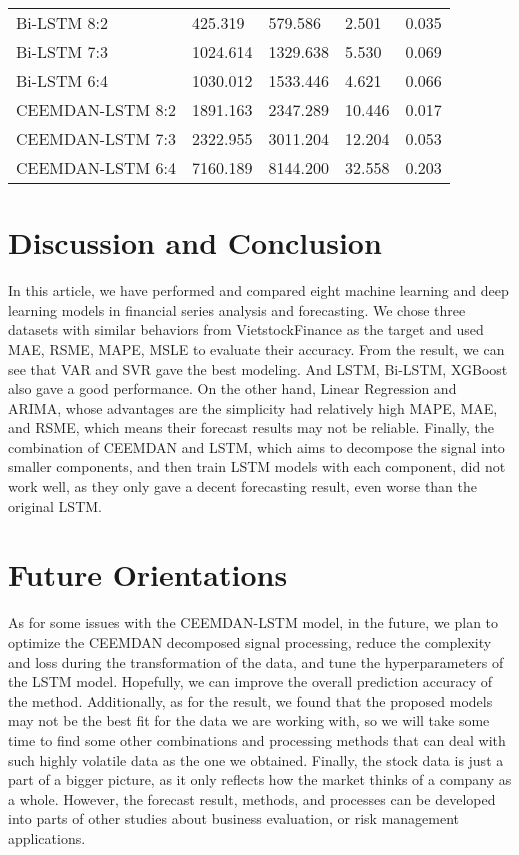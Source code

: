\documentclass{ieeeojies}
\begin{document}
\begin{table}[h]
\begin{tabular}{lp{1.1cm}p{1.2cm}p{1cm}p{0.9cm}}
\cellcolor{firstcolcolor} Bi-LSTM 8:2 & 425.319 & 579.586 & 2.501 & 0.035 \\
\cellcolor{firstcolcolor} Bi-LSTM 7:3 & 1024.614 & 1329.638 & 5.530 & 0.069 \\
\cellcolor{firstcolcolor} Bi-LSTM 6:4 & 1030.012 & 1533.446 & 4.621 & 0.066 \\
\cellcolor{firstcolcolor} CEEMDAN-LSTM 8:2 & 1891.163 & 2347.289& 10.446& 0.017\\
\cellcolor{firstcolcolor} CEEMDAN-LSTM 7:3 & 2322.955 & 3011.204 & 12.204 & 0.053\\
\cellcolor{firstcolcolor} CEEMDAN-LSTM 6:4 & 7160.189 & 8144.200 & 32.558 & 0.203 \\
\hline
\end{tabular}
\end{table}

\section{Discussion and Conclusion}
In this article, we have performed and compared eight machine learning and deep learning models in financial series analysis and forecasting. We chose three datasets with similar behaviors from VietstockFinance as the target and used MAE, RSME, MAPE, MSLE to evaluate their accuracy. From the result, we can see that VAR and SVR gave the best modeling. And LSTM, Bi-LSTM, XGBoost also gave a good performance. On the other hand, Linear Regression and ARIMA, whose advantages are the simplicity had relatively high MAPE, MAE, and RSME, which means their forecast results may not be reliable. Finally, the combination of CEEMDAN and LSTM, which aims to decompose the signal into smaller components, and then train LSTM models with each component, did not work well, as they only gave a decent forecasting result, even worse than the original LSTM. 

\section{Future Orientations}
As for some issues with the CEEMDAN-LSTM model, in the future, we plan to optimize the CEEMDAN decomposed signal processing, reduce the complexity and loss during the transformation of the data, and tune the hyperparameters of the LSTM model. Hopefully, we can improve the overall prediction accuracy of the method. Additionally, as for the result, we found that the proposed models may not be the best fit for the data we are working with, so we will take some time to find some other combinations and processing methods that can deal with such highly volatile data as the one we obtained. Finally, the stock data is just a part of a bigger picture, as it only reflects how the market thinks of a company as a whole. However, the forecast result, methods, and processes can be developed into parts of other studies about business evaluation, or risk management applications. 
\end{document}
